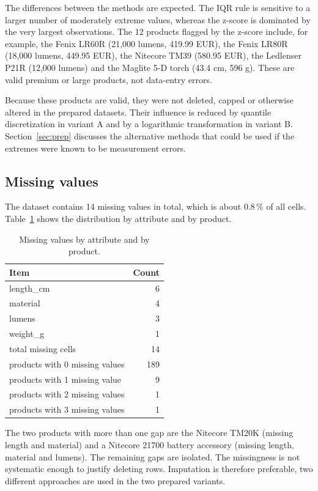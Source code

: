 \documentclass[11pt,a4paper]{article}
\begin{document}
The differences between the methods are expected. The IQR rule is sensitive to
a larger number of moderately extreme values, whereas the z-score is dominated
by the very largest observations. The 12 products flagged by the z-score
include, for example, the Fenix LR60R (21,000 lumens, 419.99 EUR), the Fenix
LR80R (18,000 lumens, 449.95 EUR), the Nitecore TM39 (580.95 EUR), the
Ledlenser P21R (12,000 lumens) and the Maglite 5-D torch (43.4 cm, 596 g).
These are valid premium or large products, not data-entry errors.

Because these products are valid, they were not deleted, capped or otherwise
altered in the prepared datasets. Their influence is reduced by quantile
discretization in variant A and by a logarithmic transformation in variant B.
Section~\ref{sec:prep} discusses the alternative methods that could be used if
the extremes were known to be measurement errors.

\subsection{Missing values}

The dataset contains 14 missing values in total, which is about 0.8\,\% of all
cells. Table~\ref{tab:missing} shows the distribution by attribute and by
product.

\begin{table}[H]
\centering
\small
\caption{Missing values by attribute and by product.}
\label{tab:missing}
\begin{tabular}{lr}
\toprule
Item & Count \\
\midrule
length\_cm & 6 \\
material & 4 \\
lumens & 3 \\
weight\_g & 1 \\
\midrule
total missing cells & 14 \\
products with 0 missing values & 189 \\
products with 1 missing value & 9 \\
products with 2 missing values & 1 \\
products with 3 missing values & 1 \\
\bottomrule
\end{tabular}
\end{table}

The two products with more than one gap are the Nitecore TM20K (missing length
and material) and a Nitecore 21700 battery accessory (missing length, material
and lumens). The remaining gaps are isolated. The missingness is not
systematic enough to justify deleting rows. Imputation is therefore preferable,
two different approaches are used in the two prepared variants.
\end{document}
